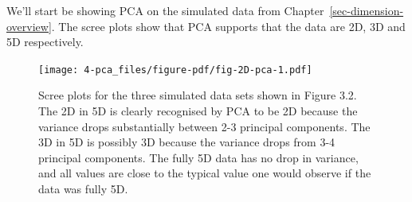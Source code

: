 \documentclass[
  letterpaper,
]{krantz}
\newenvironment{Shaded}{\begin{snugshade}}{\end{snugshade}}
\newcommand{\AttributeTok}[1]{\textcolor[rgb]{0.40,0.45,0.13}{#1}}
\newcommand{\ControlFlowTok}[1]{\textcolor[rgb]{0.00,0.23,0.31}{#1}}
\newcommand{\DecValTok}[1]{\textcolor[rgb]{0.68,0.00,0.00}{#1}}
\newcommand{\FunctionTok}[1]{\textcolor[rgb]{0.28,0.35,0.67}{#1}}
\newcommand{\NormalTok}[1]{\textcolor[rgb]{0.00,0.23,0.31}{#1}}
\newcommand{\OtherTok}[1]{\textcolor[rgb]{0.00,0.23,0.31}{#1}}
\newcommand{\SpecialCharTok}[1]{\textcolor[rgb]{0.37,0.37,0.37}{#1}}
\newcommand{\StringTok}[1]{\textcolor[rgb]{0.13,0.47,0.30}{#1}}
\begin{document}
We'll start be showing PCA on the simulated data from
Chapter~\ref{sec-dimension-overview}. The scree plots show that PCA
supports that the data are 2D, 3D and 5D respectively.

\begin{Shaded}
\end{Shaded}

\begin{figure}

{\centering \texttt{[image: 4-pca\_files/figure-pdf/fig-2D-pca-1.pdf]}

}

\caption{\label{fig-2D-pca}Scree plots for the three simulated data sets
shown in Figure 3.2. The 2D in 5D is clearly recognised by PCA to be 2D
because the variance drops substantially between 2-3 principal
components. The 3D in 5D is possibly 3D because the variance drops from
3-4 principal components. The fully 5D data has no drop in variance, and
all values are close to the typical value one would observe if the data
was fully 5D.}

\end{figure}
\end{document}
